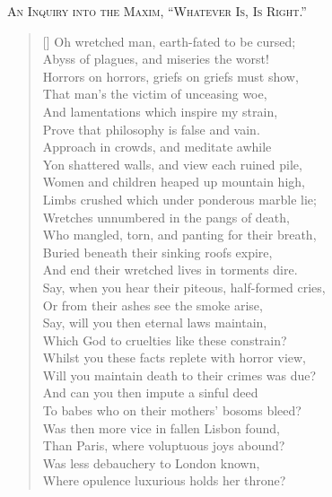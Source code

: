 \begin{center}
\textsc{An Inquiry into the Maxim, ``Whatever Is, Is Right.''}
\end{center}

\settowidth{}
\begin{verse}[\versewidth]\normalsize
Oh wretched man, earth-fated to be cursed;\\
Abyss of plagues, and miseries the worst!\\
Horrors on horrors, griefs on griefs must show,\\
That man's the victim of unceasing woe,\\
And lamentations which inspire my strain,\\
Prove that philosophy is false and vain.\\
Approach in crowds, and meditate awhile\\
Yon shattered walls, and view each ruined pile,\\
Women and children heaped up mountain high,\\
Limbs crushed which under ponderous marble lie;\\
Wretches unnumbered in the pangs of death,\\
Who mangled, torn, and panting for their breath,\\
Buried beneath their sinking roofs expire,\\
And end their wretched lives in torments dire.\\
Say, when you hear their piteous, half-formed cries,\\
Or from their ashes see the smoke arise,\\
Say, will you then eternal laws maintain,\\
Which God to cruelties like these constrain?\\
Whilst you these facts replete with horror view,\\
Will you maintain death to their crimes was due?\\
And can you then impute a sinful deed\\
To babes who on their mothers' bosoms bleed?\\
Was then more vice in fallen Lisbon found,\\
Than Paris, where voluptuous joys abound?\\
Was less debauchery to London known,\\
Where opulence luxurious holds her throne?\\

\end{verse}
